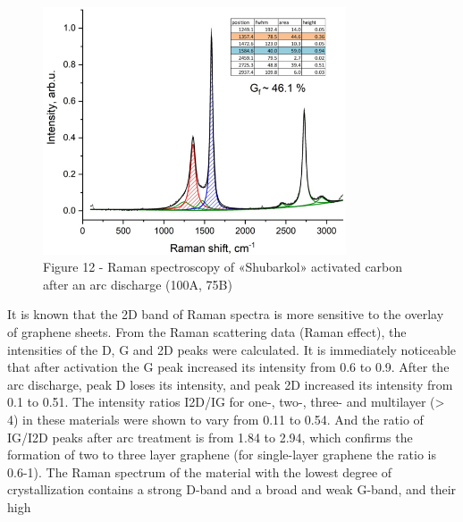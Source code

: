 \begin{figure}[H]
	\centering
	\includegraphics[width=0.8\textwidth]{assets/64}
	\caption*{Figure 12 - Raman spectroscopy of «Shubarkol» activated carbon after an arc discharge (100A, 75B)}
\end{figure}

\begin{multicols}{2}
It is known that the 2D band of Raman spectra is more sensitive to the
overlay of graphene sheets. From the Raman scattering data (Raman
effect), the intensities of the D, G and 2D peaks were calculated. It is
immediately noticeable that after activation the G peak increased its
intensity from 0.6 to 0.9. After the arc discharge, peak D loses its
intensity, and peak 2D increased its intensity from 0.1 to 0.51. The
intensity ratios I2D/IG for one-, two-, three- and multilayer
(\textgreater{} 4) in these materials were shown to vary from 0.11 to
0.54. And the ratio of IG/I2D peaks after arc treatment is from 1.84 to
2.94, which confirms the formation of two to three layer graphene (for
single-layer graphene the ratio is 0.6-1). The Raman spectrum of the
material with the lowest degree of crystallization contains a strong
D-band and a broad and weak G-band, and their high
\end{multicols}

